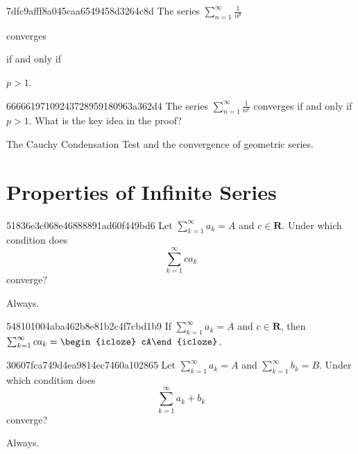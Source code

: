 \begin{note}{7dfc9afff8a045caa6549458d3264c8d}
    The series \({ \sum_{n=1}^{\infty} \frac{1}{n^{p}} }\) \begin{icloze}{2}converges\end{icloze} \begin{icloze}{3}if and only if\end{icloze} \begin{icloze}{1}\({ p > 1 }\).\end{icloze}
\end{note}

\begin{note}{66666197109243728959180963a362d4}
    The series \({ \sum_{n=1}^{\infty} \frac{1}{n^{p}} }\) converges if and only if \({ p > 1 }\).
    What is the key idea in the proof?

    \begin{cloze}{1}
        The Cauchy Condensation Test and the convergence of geometric series.
    \end{cloze}
\end{note}

\section{Properties of Infinite Series} %
\begin{note}{51836e3c068e46888891ad60f449bd6}
    Let \({ \sum_{k=1}^{\infty} a_k = A }\) and \({ c \in \mathbf{R} }\).
    Under which condition does
    \[
        \sum_{k=1}^{\infty} ca_k
    \]
    converge?

    \begin{cloze}{1}
        Always.
    \end{cloze}
\end{note}

\begin{note}{548101004aba462b8e81b2c4f7cbd1b9}
    If \({ \sum_{k=1}^{\infty} a_k = A }\) and \({ c \in \mathbf{R} }\), then \({ \sum_{k=1}^{\infty} ca_k = \begin{icloze}{1}cA\end{icloze} }\).
\end{note}

\begin{note}{30607fca749d4ea9814ec7460a102865}
    Let \({ \sum_{k=1}^{\infty} a_k = A }\) and \({ \sum_{k=1}^{\infty} b_k = B }\).
    Under which condition does
    \[
        \sum_{k=1}^{\infty} a_k + b_k
    \]
    converge?

    \begin{cloze}{1}
        Always.
    \end{cloze}
\end{note}

